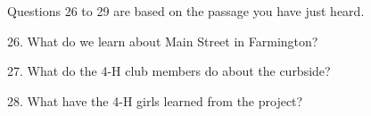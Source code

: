 \documentclass[12pt]{article}
\begin{document}
\vspace{0.00mm}

\vspace{0.00mm}
\setlength{\parindent}{0.00mm}
\setlength{\leftskip}{-6.23mm}
\setlength{\rightskip}{0.00mm}

Questions 26 to 29 are based on the passage you have just heard.
\vspace{0.00mm}

\vspace{0.00mm}
\setlength{\parindent}{0.00mm}
\setlength{\leftskip}{-6.23mm}
\setlength{\rightskip}{0.00mm}


\vspace{0.00mm}

\vspace{0.00mm}
\setlength{\parindent}{0.00mm}
\setlength{\leftskip}{-6.23mm}
\setlength{\rightskip}{0.00mm}

26. What do we learn about Main Street in Farmington?
\vspace{0.00mm}

\vspace{0.00mm}
\setlength{\parindent}{0.00mm}
\setlength{\leftskip}{-6.23mm}
\setlength{\rightskip}{0.00mm}


\vspace{0.00mm}

\vspace{0.00mm}
\setlength{\parindent}{0.00mm}
\setlength{\leftskip}{-6.23mm}
\setlength{\rightskip}{0.00mm}

27. What do the 4-H club members do about the curbside?
\vspace{0.00mm}

\vspace{0.00mm}
\setlength{\parindent}{0.00mm}
\setlength{\leftskip}{-6.23mm}
\setlength{\rightskip}{0.00mm}


\vspace{0.00mm}

\vspace{0.00mm}
\setlength{\parindent}{0.00mm}
\setlength{\leftskip}{-6.23mm}
\setlength{\rightskip}{0.00mm}

28. What have the 4-H girls learned from the project?
\vspace{0.00mm}

\vspace{0.00mm}
\setlength{\parindent}{0.00mm}
\setlength{\leftskip}{-6.23mm}
\setlength{\rightskip}{0.00mm}


\vspace{0.00mm}
\end{document}

